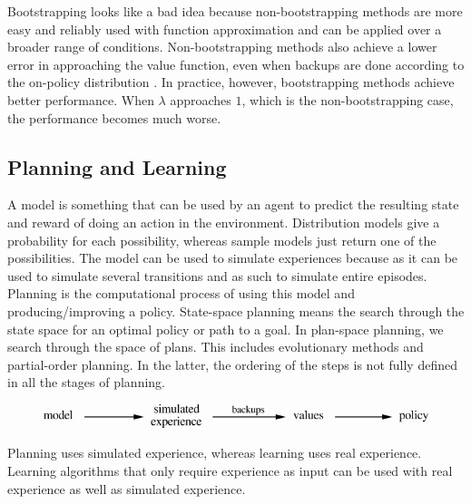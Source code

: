 \documentclass[a4paper]{article}
\begin{document}
Bootstrapping looks like a bad idea because non-bootstrapping methods are more easy and reliably used with function approximation and can be applied over a broader range of conditions. Non-bootstrapping methods also achieve a lower error in approaching the value function, even when backups are done according to the on-policy distribution \citep{ML}. In practice, however, bootstrapping methods achieve better performance. When $\lambda$ approaches $1$, which is the non-bootstrapping case, the performance becomes much worse.

\subsection{Planning and Learning}
A model is something that can be used by an agent to predict the resulting state and reward of doing an action in the environment. Distribution models give a probability for each possibility, whereas sample models just return one of the possibilities. The model can be used to simulate experiences because as it can be used to simulate several transitions and as such to simulate entire episodes.\\
Planning is the computational process of using this model and producing/improving a policy. State-space planning means the search through the state space for an optimal policy or path to a goal. In plan-space planning, we search through the space of plans. This includes evolutionary methods and partial-order planning. In the latter, the ordering of the steps is not fully defined in all the stages of planning.
\begin{figure}[H]
\includegraphics[width=\linewidth]{images/modelplanning.png}
\label{fig:modelplanning}
\end{figure}
Planning uses simulated experience, whereas learning uses real experience. Learning algorithms that only require experience as input can be used with real experience as well as simulated experience.\\
\end{document}
